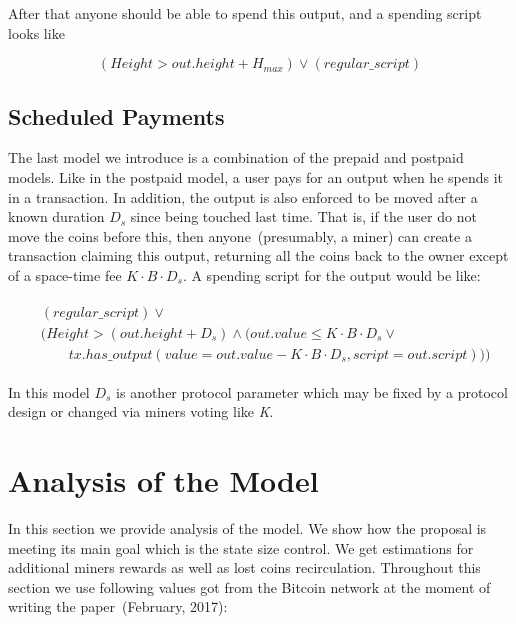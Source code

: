 \documentclass[]{llncs}   %
\begin{document}
After that anyone should be able to spend this output, and a spending script looks like

\begin{equation}
(Height > out.height + H_{max}) \lor (regular\_script)
\end{equation}


\subsection{Scheduled Payments}
\label{sec-scheduled}

The last model we introduce is a combination of the prepaid and postpaid models. Like in the postpaid model, a user pays for an output when he spends it in a transaction. In addition, the output is also enforced to be moved after a known duration $D_{s}$ since being touched last time. That is, if the user do not move the coins before this, then anyone~(presumably, a miner) can create a transaction claiming this output, returning all the coins back to the owner except of a space-time fee ${K \cdot B \cdot D_{s}}$. A spending script for the output would be like:

\begin{align}
\begin{split}
&(regular\_script) \lor \\
&(Height > (out.height + D_s) \land (out.value \le K \cdot B \cdot D_s \lor \\  
&\qquad tx.has\_output(value = out.value - K \cdot B \cdot D_s, script = out.script)))
\end{split}
\end{align}

In this model $D_s$ is another protocol parameter which may be fixed by a protocol design or changed via miners voting like \textit{K}.

\section{Analysis of the Model}
\label{sec:analysis}

In this section we provide analysis of the model. We show how the proposal is meeting its main goal which is the state size control. We get estimations for additional miners rewards as well as lost coins recirculation. Throughout this section we use following values got from the Bitcoin network at the moment of writing the paper~(February, 2017):
\end{document}
